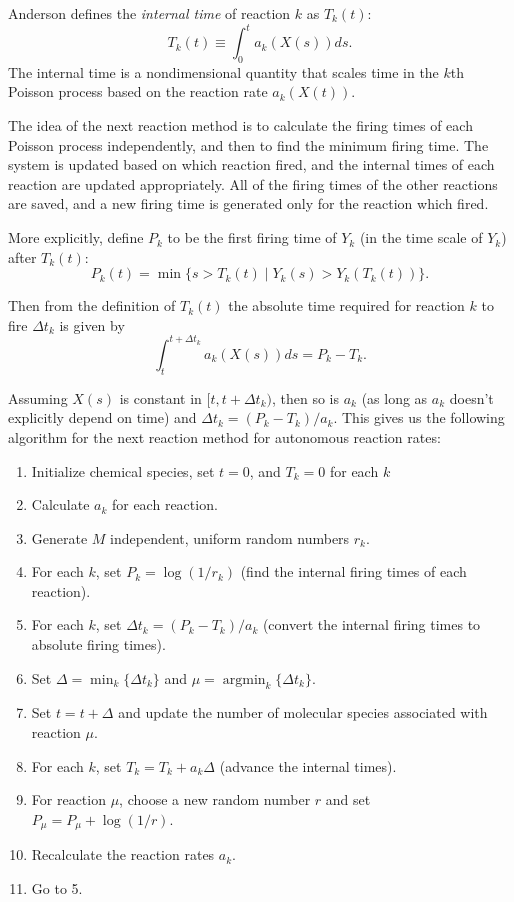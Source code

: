 \documentclass{article}
\begin{document}
Anderson defines the \emph{internal time} of reaction $k$ as $T_k(t)$:
\begin{equation}
  \label{eq:T-def}
  T_k(t) \equiv \int_0^t a_k(X(s)) ds.
\end{equation}
The internal time is a nondimensional quantity that scales time in the
$k$th Poisson process based on the reaction rate $a_k(X(t))$.

The idea of the next reaction method is to calculate the firing times
of each Poisson process independently, and then to find the minimum
firing time. The system is updated based on which reaction fired, and
the internal times of each reaction are updated appropriately. All of
the firing times of the other reactions are saved, and a new firing
time is generated only for the reaction which fired.

More explicitly, define $P_k$ to be the first firing time of $Y_k$ (in
the time scale of $Y_k$) after $T_k(t)$:
\begin{equation}
  \label{eq:P-def}
  P_k(t) = \min\{s > T_k(t) \mid Y_k(s) > Y_k(T_k(t)) \}.
\end{equation}

Then from the definition of $T_k(t)$ the absolute time required for
reaction $k$ to fire $\Delta t_k$ is given by
\begin{equation}
  \label{eq:dtk-def}
  \int_t^{t + \Delta t_k} a_k(X(s)) ds = P_k - T_k.
\end{equation}


Assuming $X(s)$ is constant in $[t, t + \Delta t_k)$, then so is $a_k$
(as long as $a_k$ doesn't explicitly depend on time) and
$\Delta t_k = (P_k - T_k)/a_k$. This gives us the following algorithm
for the next reaction method for autonomous reaction rates:
\begin{enumerate}
\item Initialize chemical species, set $t=0$, and $T_k = 0$ for
  each $k$
\item Calculate $a_k$ for each reaction.
\item Generate $M$ independent, uniform random numbers $r_k$.
\item For each $k$, set $P_k = \log(1/r_k)$ (find the internal firing
  times of each reaction).
\item For each $k$, set $\Delta t_k = (P_k - T_k)/a_k$ (convert the
  internal firing times to absolute firing times).
\item Set $\Delta = \min_k \{\Delta t_k\}$ and
  $\mu = \operatorname{argmin}_k \{\Delta t_k\}$.
\item Set $t = t + \Delta$ and update the number of molecular species
  associated with reaction $\mu$.
\item For each $k$, set $T_k = T_k + a_k \Delta$ (advance the internal
  times).
\item For reaction $\mu$, choose a new random number $r$ and set
  $P_\mu = P_\mu + \log(1/r)$.
\item Recalculate the reaction rates $a_k$.
\item Go to 5.
\end{enumerate}
\end{document}
